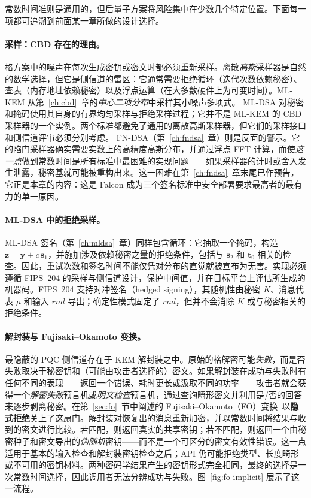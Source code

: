 常数时间准则是通用的，但后量子方案将风险集中在少数几个特定位置。下面每一项都可追溯到前面某一章所做的设计选择。

\paragraph{采样：CBD 存在的理由。}
格方案中的噪声在每次生成密钥或密文时都必须重新采样。离散\emph{高斯}采样器是自然的数学选择，但它是侧信道的雷区：它通常需要拒绝循环（迭代次数依赖秘密）、查表（内存地址依赖秘密）以及浮点运算（在大多数硬件上为可变时间）。ML-KEM 从第~\ref{ch:cbd}~章的\emph{中心二项分布}中采样其小噪声多项式。
ML-DSA 对秘密和掩码使用其自身的有界均匀采样与拒绝采样过程；它并不是 ML-KEM 的 CBD 采样器的一个实例。两个标准都避免了通用的离散高斯采样器，但它们的采样接口和侧信道评审必须分别考虑。
FN-DSA（第~\ref{ch:fndsa}~章）则是反面的警示。它的陷门采样器确实需要实数上的高精度高斯分布，并通过浮点 FFT 计算，而使\emph{这一点}做到常数时间是所有标准中最困难的实现问题——如果采样器的计时或舍入发生泄露，秘密基就可能被重构出来。这一困难在第~\ref{ch:fndsa}~章末尾已作预告，它正是本章的内容：这是 Falcon 成为三个签名标准中安全部署要求最高者的最有力的单一原因。

\paragraph{ML-DSA 中的拒绝采样。}
ML-DSA 签名（第~\ref{ch:mldsa}~章）同样包含循环：它抽取一个掩码，构造 $\mathbf{z}=\mathbf{y}+c\,\mathbf{s}_1$，并施加涉及依赖秘密之量的拒绝条件，包括与 $\mathbf{s}_2$ 和 $\mathbf{t}_0$ 相关的检查。因此，重试次数和签名时间不能仅凭对分布的直觉就被宣布为无害。实现必须遵循 FIPS~204 的采样与侧信道设计，保护中间值，并在目标平台上评估所生成的机器码。FIPS~204 支持对冲签名（hedged signing），其随机性由秘密 $K$、消息代表 $\mu$ 和输入 $rnd$ 导出；确定性模式固定了 $rnd$，但并不会消除 $K$ 或与秘密相关的拒绝条件。

\paragraph{解封装与 Fujisaki--Okamoto 变换。}
最隐蔽的 PQC 侧信道存在于 KEM 解封装之中。原始的格解密可能\emph{失败}，而是否失败取决于秘密钥和（可能由攻击者选择的）密文。如果解封装在成功与失败时有任何不同的表现——返回一个错误、耗时更长或汲取不同的功率——攻击者就会获得一个\emph{解密失败}预言机或\emph{明文检查}预言机，通过查询畸形密文并利用是/否的回答来逐步剥离秘密。在第~\ref{sec:fo}~节中阐述的 Fujisaki--Okamoto（FO）变换~\cite{fo1999}以\textbf{隐式拒绝}关上了这扇门。解封装对恢复出的消息重新加密，并以常数时间将结果与收到的密文进行比较。若匹配，则返回真实的共享密钥；若不匹配，则返回一个由秘密种子和密文导出的\emph{伪随机}密钥——而不是一个可区分的密文有效性错误。这一点适用于基本的输入检查和解封装密钥检查之后；API 仍可能拒绝类型、长度畸形或不可用的密钥材料。两种密码学结果产生的密钥形式完全相同，最终的选择是一次常数时间选择，因此调用者无法分辨成功与失败。图~\ref{fig:fo-implicit} 展示了这一流程。


